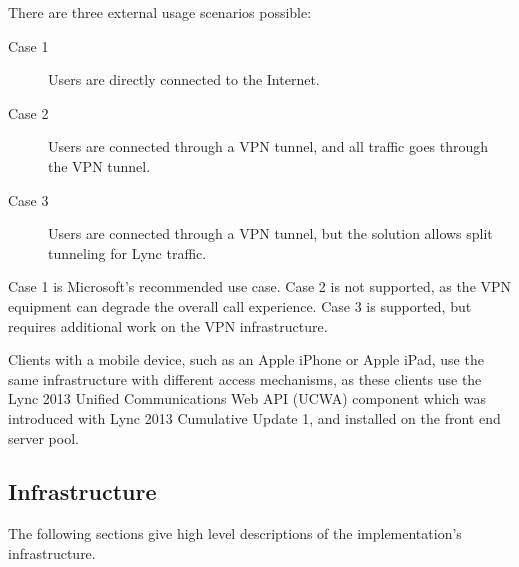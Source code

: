 There are three external usage scenarios possible:
\begin{description}
	\item[Case 1] Users are directly connected to the Internet.
	\item[Case 2] Users are connected through a VPN tunnel, and all traffic goes through the VPN tunnel.
	\item[Case 3] Users are connected through a VPN tunnel, but the solution allows split tunneling for Lync traffic.
\end{description}
Case 1 is Microsoft's recommended use case. Case 2 is not supported, as the VPN equipment can degrade the overall call experience. Case 3 is supported, but requires additional work on the VPN infrastructure.

Clients with a mobile device, such as an Apple iPhone or Apple iPad, use the same infrastructure with different access mechanisms, as these clients use the Lync 2013 Unified Communications Web API (UCWA) component which was introduced with Lync 2013 Cumulative Update 1, and installed on the front end server pool.






\subsection{Infrastructure}
	The following sections give high level descriptions of the implementation's infrastructure.

